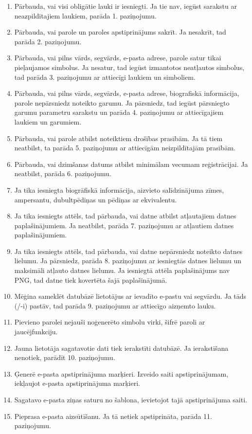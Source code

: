 {
	\begin{enumerate}
		\item Pārbauda, vai visi obligātie lauki ir iesniegti.
		      Ja tie nav, iegūst sarakstu ar neazpildītajiem laukiem, parāda 1. paziņojumu.
		\item Pārbauda, vai parole un paroles apstiprinājums sakrīt.
		      Ja nesakrīt, tad parāda 2. paziņojumu.
		\item Pārbauda, vai pilns vārds, segvārds, e-pasta adrese, parole satur tikai pieļaujamos simbolus.
		      Ja nesatur, tad iegūst izmantotos neatļautos simbolus, tad parāda 3. paziņojumu ar attiecīgi laukiem un simboliem.
		\item Pārbauda, vai pilns vārds, segvārds, e-pasta adrese, biografiskā informācija, parole nepārsniedz noteikto garumu.
		      Ja pārsniedz, tad iegūst pārsniegto garumu parametru sarakstu un parāda 4. paziņojumu ar attiecīgajiem laukiem un garumiem.
		\item Pārbauda, vai parole atbilst noteiktiem drošības prasībām.
		      Ja tā tiem neatbilst, ta parāda 5. paziņojumu ar attiecīgām neizpildītajām prasībām.
		\item Pārbauda, vai dzimšanas datums atbilst minimālam vecumam reģistrācijai.
		      Ja neatbilst, parāda 6. paziņojumu.
		\item Ja tika iesniegta biogrāfiskā informācija, aizvieto salīdzinājuma zīmes, ampersantu, dubultpēdiņas un pēdiņas ar ekvivalentu.
		\item Ja tika iesniegts attēls, tad pārbauda, vai datne atbilst atļautajiem datnes paplašinājumiem.
		      Ja neatbilst, parāda 7. paziņojumu ar atļautiem datnes paplašinājumiem.
		\item Ja tika iesniegts attēls, tad pārbauda, vai datne nepārsniedz noteikto datnes lielumu.
		      Ja pārsniedz, parāda 8. paziņojumu ar iesniegtās datnes lielumu un maksimāli atļauto datnes lielumu.
		      Ja iesniegtā attēla paplašinājums nav PNG, tad datne tiek kovertēta šajā paplašinājumā.
		\item Mēģina sameklēt datubāzē lietotājus ar ievadīto e-pastu vai segvārdu.
		      Ja tāds (/-i) pastāv, tad parāda 9. paziņojumu ar attiecīgo aizņemto lauku.
		\item Pievieno parolei nejauši noģenerēto simbolu virki, šifrē paroli ar jaucējfunkciju.
		\item Jauna lietotāja sagatavotie dati tiek ierakstīti datubāzē.
		      Ja ierakstīšana nenotiek, parādīt 10. paziņojumu.
		\item Ģenerē e-pasta apstiprinājuma marķieri.
		      Izveido saiti apstiprinājumam, iekļaujot e-pasta apstiprinājuma marķieri.
		\item Sagatavo e-pasta ziņas saturu no šablona, ievietojot tajā apstiprinājuma saiti.
		\item Pieprasa e-pasta aizsūtīšanu.
		      Ja tā netiek apstiprināta, parāda 11. paziņojumu.
	\end{enumerate}
}
